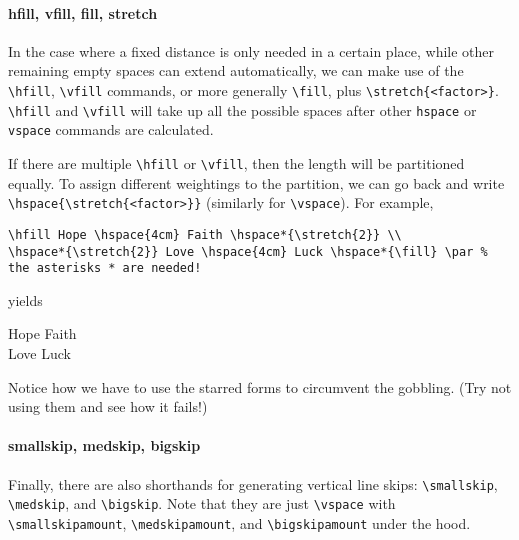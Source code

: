 \paragraph{hfill, vfill, fill, stretch}
In the case where a fixed distance is only needed in a certain place, while other remaining empty spaces can extend automatically, we can make use of the \texttt{\textbackslash hfill}, \texttt{\textbackslash vfill} commands, or more generally \texttt{\textbackslash fill}, plus \texttt{\textbackslash stretch\{<factor>\}}. \texttt{\textbackslash hfill} and \texttt{\textbackslash vfill} will take up all the possible spaces after other \texttt{\text hspace} or \texttt{\text vspace} commands are calculated.

If there are multiple \texttt{\textbackslash hfill} or \texttt{\textbackslash vfill}, then the length will be partitioned equally. To assign different weightings to the partition, we can go back and write \texttt{\textbackslash hspace\{\textbackslash stretch\{<factor>\}\}} (similarly for \texttt{\textbackslash vspace}). For example,
\begin{lstlisting}
\hfill Hope \hspace{4cm} Faith \hspace*{\stretch{2}} \\
\hspace*{\stretch{2}} Love \hspace{4cm} Luck \hspace*{\fill} \par % the asterisks * are needed!
\end{lstlisting}
yields \par
\hfill Hope \hspace{4cm} Faith  \\
 Love \hspace{4cm} Luck \hspace*{\fill} \par
Notice how we have to use the starred forms to circumvent the gobbling. (Try not using them and see how it fails!)

\paragraph{smallskip, medskip, bigskip} Finally, there are also shorthands for generating vertical line skips: \texttt{\textbackslash smallskip}, \texttt{\textbackslash medskip}, and \texttt{\textbackslash bigskip}. Note that they are just \texttt{\textbackslash vspace} with \texttt{\textbackslash smallskipamount}, \texttt{\textbackslash medskipamount}, and \texttt{\textbackslash bigskipamount} under the hood.

